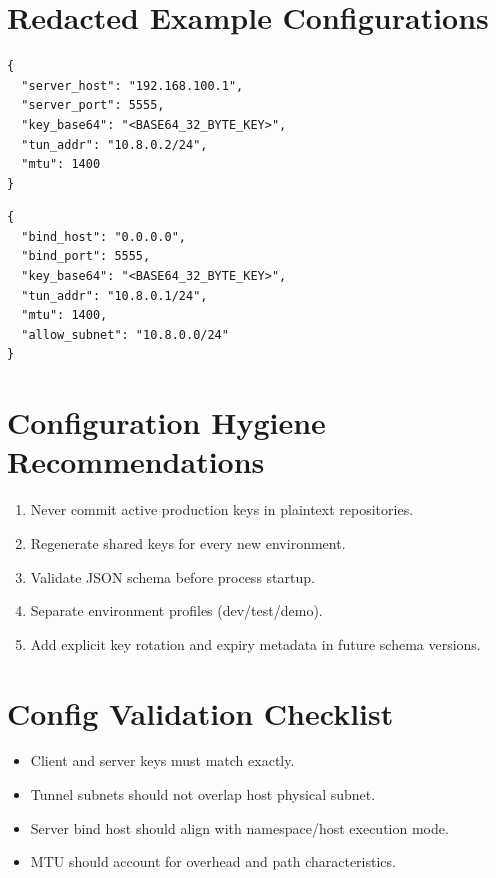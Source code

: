 \section{Redacted Example Configurations}
\begin{lstlisting}[style=vpnpython,caption={Client JSON example (redacted key)}]
{
  "server_host": "192.168.100.1",
  "server_port": 5555,
  "key_base64": "<BASE64_32_BYTE_KEY>",
  "tun_addr": "10.8.0.2/24",
  "mtu": 1400
}
\end{lstlisting}

\begin{lstlisting}[style=vpnpython,caption={Server JSON example (redacted key)}]
{
  "bind_host": "0.0.0.0",
  "bind_port": 5555,
  "key_base64": "<BASE64_32_BYTE_KEY>",
  "tun_addr": "10.8.0.1/24",
  "mtu": 1400,
  "allow_subnet": "10.8.0.0/24"
}
\end{lstlisting}

\section{Configuration Hygiene Recommendations}
\begin{enumerate}[leftmargin=2em]
\item Never commit active production keys in plaintext repositories.
\item Regenerate shared keys for every new environment.
\item Validate JSON schema before process startup.
\item Separate environment profiles (dev/test/demo).
\item Add explicit key rotation and expiry metadata in future schema versions.
\end{enumerate}

\section{Config Validation Checklist}
\begin{itemize}[leftmargin=2em]
\item Client and server keys must match exactly.
\item Tunnel subnets should not overlap host physical subnet.
\item Server bind host should align with namespace/host execution mode.
\item MTU should account for overhead and path characteristics.
\end{itemize}

